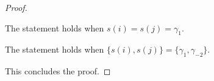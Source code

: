 \begin{proof}
	\begin{claim}
		The statement holds when $s(i) = s(j) = \gamma_{1}$.
	\end{claim}

	\begin{claimproof}
	\end{claimproof}

	\begin{claim}
		The statement holds when $ \{ s(i),s(j) \} = \{ \gamma_{1}, \gamma_{-2} \}$.
	\end{claim}

	\begin{claimproof}
		\manolis{TODO!}
	\end{claimproof}
	This concludes the proof.
\end{proof}


